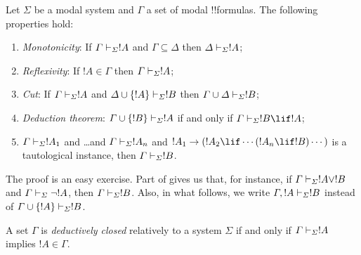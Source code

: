 \documentclass[../../../include/open-logic-section]{subfiles}
\begin{document}


\begin{prop}
  Let $\Sigma$ be a modal system and $\Gamma$ a set of modal
  !!{formula}s. The following properties hold:
  \begin{enumerate}
  \item{} \emph{Monotonicity}: If
    $\Gamma \Proves[\Sigma] !A$ and $\Gamma \subseteq \Delta$ then
    $\Delta \Proves[\Sigma] !A$;
  \item{}
    \emph{Reflexivity}: If $!A \in \Gamma$ then $\Gamma
    \Proves[\Sigma] !A$;
  \item{} \emph{Cut}: If $\Gamma
    \Proves[\Sigma] !A$ and $\Delta \cup \{!A\} \Proves[\Sigma] !B$
    then $\Gamma \cup \Delta \Proves[\Sigma] !B$;
  \item{} \emph{Deduction theorem}: $\Gamma \cup \{!B\}
    \Proves[\Sigma] !A$ if and only if $\Gamma \Proves[\Sigma] !B \lif
      !A$;
  \item {}%
    $\Gamma \Proves[\Sigma] !A_1$ and \dots and $\Gamma
    \Proves[\Sigma] !A_n$ and $!A_1 \to (!A_2 \lif \cdots (!A_n \lif
    !B)\cdots)$ is a tautological instance, then $\Gamma
    \Proves[\Sigma] !B$.
  \end{enumerate}
\end{prop}

The proof is an easy exercise. Part
 of 
gives us that, for instance, if $\Gamma \Proves[\Sigma] !A \lor !B$
and $\Gamma \Proves[\Sigma] \lnot !A$, then $\Gamma \Proves[\Sigma]
!B$. Also, in what follows, we write $\Gamma, !A \Proves[\Sigma] !B$
instead of $\Gamma \cup \{ !A\} \Proves[\Sigma] !B$.

\begin{defn}
  A set $\Gamma$ is \emph{deductively closed} relatively to a system
  $\Sigma$ if and only if $\Gamma \Proves[\Sigma] !A$ implies
  $!A \in \Gamma$.
\end{defn}
\end{document}
